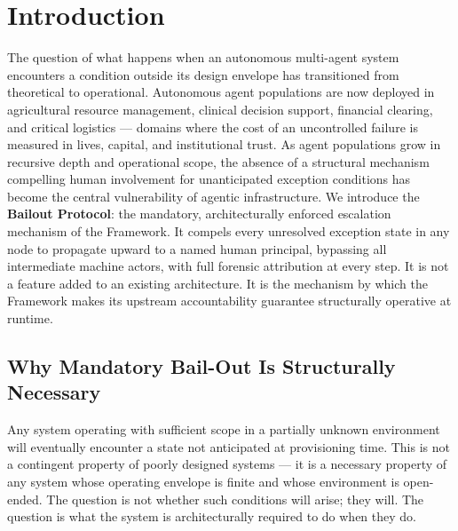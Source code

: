 \section{Introduction}
\label{sec:introduction}

The question of what happens when an autonomous multi-agent system encounters a condition outside its design envelope has transitioned from theoretical to operational. Autonomous agent populations are now deployed in agricultural resource management, clinical decision support, financial clearing, and critical logistics — domains where the cost of an uncontrolled failure is measured in lives, capital, and institutional trust. As agent populations grow in recursive depth and operational scope, the absence of a structural mechanism compelling human involvement for unanticipated exception conditions has become the central vulnerability of agentic infrastructure. We introduce the \textbf{Bailout Protocol}: the mandatory, architecturally enforced escalation mechanism of the \bxthree{} Framework. It compels every unresolved exception state in any \bxthree{} node to propagate upward to a named human principal, bypassing all intermediate machine actors, with full forensic attribution at every step. It is not a feature added to an existing architecture. It is the mechanism by which the \bxthree{} Framework makes its upstream accountability guarantee structurally operative at runtime.

\subsection{Why Mandatory Bail-Out Is Structurally Necessary}
\label{sec:why-mandatory}

Any system operating with sufficient scope in a partially unknown environment will eventually encounter a state not anticipated at provisioning time. This is not a contingent property of poorly designed systems — it is a necessary property of any system whose operating envelope is finite and whose environment is open-ended. The question is not whether such conditions will arise; they will. The question is what the system is architecturally required to do when they do.

